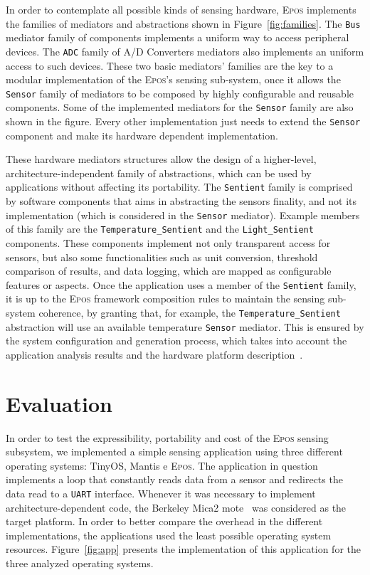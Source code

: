 In order to contemplate all possible kinds of sensing hardware,
\textsc{Epos} implements the families of mediators and abstractions
shown in Figure~\ref{fig:families}. The \texttt{Bus} mediator family of
components implements a uniform way to access peripheral devices. The
\texttt{ADC} family of A/D Converters mediators also implements an
uniform access to such devices. These two basic mediators' families are
the key to a modular implementation of the \textsc{Epos}'s sensing
sub-system, once it allows the \texttt{Sensor} family of
mediators to be composed by highly configurable and reusable components.
Some of the implemented mediators for the \texttt{Sensor} family
are also shown in the figure. Every other implementation just needs to
extend the \texttt{Sensor} component and make its hardware
dependent implementation.



These hardware mediators structures allow the design of a higher-level,
architecture-independent family of abstractions, which can be used by
applications without affecting its portability. The \texttt{Sentient}
family is comprised by software components that aims in abstracting the
sensors finality, and not its implementation (which is considered in the
\texttt{Sensor} mediator). Example members of this family are the
\texttt{Temperature\_Sentient} and the \texttt{Light\_Sentient} components. 
These components
implement not only transparent access for sensors, but also some
functionalities such as unit conversion, threshold comparison of
results, and data logging, which are mapped as configurable features or
aspects. 
Once the application uses a member of the \texttt{Sentient} family, it
is up to the \textsc{Epos} framework composition rules to maintain the
sensing sub-system coherence, by granting that, for example, the
\texttt{Temperature\_Sentient} abstraction will use an available
temperature \texttt{Sensor} mediator. This is ensured by the
system configuration and generation process, which takes into account
the application analysis results and the hardware platform
description~\cite{Tondello:2005}.



\section{Evaluation}



In order to test the expressibility, portability and cost of the
\textsc{Epos} sensing subsystem, we implemented a simple sensing
application using three different operating systems: TinyOS, Mantis e
\textsc{Epos}. The application in question implements a loop that
constantly reads data from a sensor and redirects the data read to a
\texttt{UART} interface. Whenever it was necessary to implement
architecture-dependent code, the Berkeley Mica2 mote~\cite{Hill:2000}
was considered as the target platform. In order to better compare the
overhead in the different implementations, the applications used the
least possible operating system resources. Figure~\ref{fig:app} presents
the implementation of this application for the three analyzed
operating systems. 

